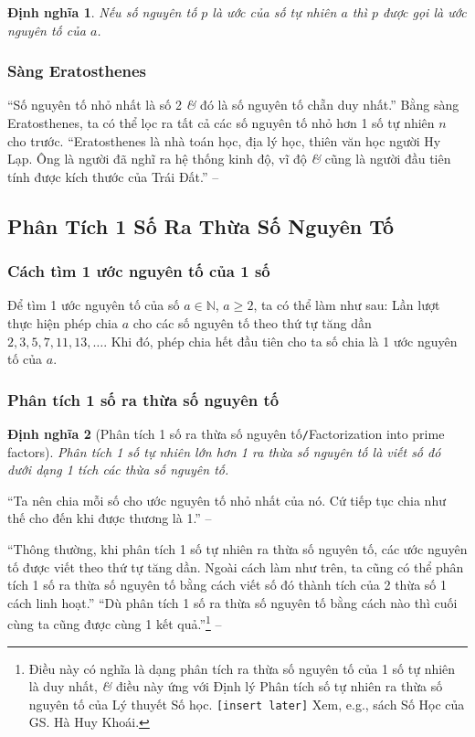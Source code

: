 \documentclass{article}
\numberwithin{equation}{section}
\newtheorem{definition}{Định nghĩa}[section]
\begin{document}
\begin{definition}
	Nếu số nguyên tố $p$ là ước của số tự nhiên $a$ thì $p$ được gọi là \emph{ước nguyên tố} của $a$.
\end{definition}

\subsubsection{Sàng Eratosthenes}
``Số nguyên tố nhỏ nhất là số 2 \textit{\&} đó là số nguyên tố chẵn duy nhất.'' Bằng sàng Eratosthenes, ta có thể lọc ra tất cả các số nguyên tố nhỏ hơn 1 số tự nhiên $n$ cho trước. ``Eratosthenes là nhà toán học, địa lý học, thiên văn học người Hy Lạp. Ông là người đã nghĩ ra hệ thống kinh độ, vĩ độ \textit{\&} cũng là người đầu tiên tính được kích thước của Trái Đất.'' -- \cite[p. 43]{Thai_Anh_Dat_Ha_Loan_Nam_Quang_Toan_6_tap_1}

\subsection{Phân Tích 1 Số Ra Thừa Số Nguyên Tố}

\subsubsection{Cách tìm 1 ước nguyên tố của 1 số}
\begin{tcolorbox}
	Để tìm 1 ước nguyên tố của số $a\in\mathbb{N}$, $a\ge 2$, ta có thể làm như sau: Lần lượt thực hiện phép chia $a$ cho các số nguyên tố theo thứ tự tăng dần $2,3,5,7,11,13,\ldots$. Khi đó, phép chia hết đầu tiên cho ta số chia là 1 ước nguyên tố của $a$.
\end{tcolorbox}

\subsubsection{Phân tích 1 số ra thừa số nguyên tố}

\begin{definition}[Phân tích 1 số ra thừa số nguyên tố\texttt{/}Factorization into prime factors]
	\emph{Phân tích 1 số tự nhiên lớn hơn 1 ra thừa số nguyên tố} là viết số đó dưới dạng 1 tích các thừa số nguyên tố.
\end{definition}
``Ta nên chia mỗi số cho ước nguyên tố nhỏ nhất của nó. Cứ tiếp tục chia như thế cho đến khi được thương là 1.'' -- \cite[p. 45]{Thai_Anh_Dat_Ha_Loan_Nam_Quang_Toan_6_tap_1}

``Thông thường, khi phân tích 1 số tự nhiên ra thừa số nguyên tố, các ước nguyên tố được viết theo thứ tự tăng dần. Ngoài cách làm như trên, ta cũng có thể phân tích 1 số ra thừa số nguyên tố bằng cách viết số đó thành tích của 2 thừa số 1 cách linh hoạt.'' ``Dù phân tích 1 số ra thừa số nguyên tố bằng cách nào thì cuối cùng ta cũng được cùng 1 kết quả.''\footnote{Điều này có nghĩa là dạng phân tích ra thừa số nguyên tố của 1 số tự nhiên là duy nhất, \textit{\&} điều này ứng với Định lý Phân tích số tự nhiên ra thừa số nguyên tố của Lý thuyết Số học. \texttt{[insert later]} Xem, e.g., sách Số Học của GS. Hà Huy Khoái.} -- \cite[p. 46]{Thai_Anh_Dat_Ha_Loan_Nam_Quang_Toan_6_tap_1}
\end{document}
